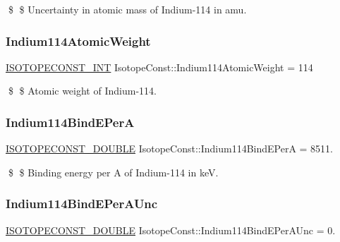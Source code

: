 \$ \$ Uncertainty in atomic mass of Indium-\/114 in amu. \mbox{\label{group___isotope_const-_indium-_in114_gab8254ad61f1419686ec9d463ab089908}} 
\subsubsection{\texorpdfstring{Indium114\+Atomic\+Weight}{Indium114AtomicWeight}}
{\footnotesize\ttfamily \mbox{\hyperlink{group___isotope_const-_macros_ga5f18360b3e99483a35c32d789e62621c}{I\+S\+O\+T\+O\+P\+E\+C\+O\+N\+S\+T\+\_\+\+I\+NT}} Isotope\+Const\+::\+Indium114\+Atomic\+Weight = 114}

\$ \$ Atomic weight of Indium-\/114. \mbox{\label{group___isotope_const-_indium-_in114_ga25fec607abf71d006d01ea8e908b59b8}} 
\subsubsection{\texorpdfstring{Indium114\+Bind\+E\+PerA}{Indium114BindEPerA}}
{\footnotesize\ttfamily \mbox{\hyperlink{group___isotope_const-_macros_ga8f45a7272ce02c0b4c65c44636ed719a}{I\+S\+O\+T\+O\+P\+E\+C\+O\+N\+S\+T\+\_\+\+D\+O\+U\+B\+LE}} Isotope\+Const\+::\+Indium114\+Bind\+E\+PerA = 8511.}

\$ \$ Binding energy per A of Indium-\/114 in keV. \mbox{\label{group___isotope_const-_indium-_in114_ga4c52bf276db799de1443c50128a5fc41}} 
\subsubsection{\texorpdfstring{Indium114\+Bind\+E\+Per\+A\+Unc}{Indium114BindEPerAUnc}}
{\footnotesize\ttfamily \mbox{\hyperlink{group___isotope_const-_macros_ga8f45a7272ce02c0b4c65c44636ed719a}{I\+S\+O\+T\+O\+P\+E\+C\+O\+N\+S\+T\+\_\+\+D\+O\+U\+B\+LE}} Isotope\+Const\+::\+Indium114\+Bind\+E\+Per\+A\+Unc = 0.}

